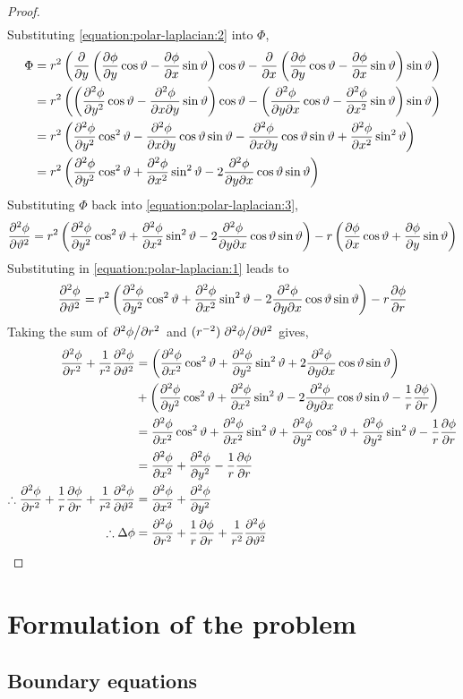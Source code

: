 \begin{lemma}
\begin{proof}
\begin{align}
        \end{align}
        Substituting \eqref{equation:polar-laplacian:2} into $\Phi$,
        \begin{align*}
            \Phi&=r^2\left(\pdv{y}\left(\pdv{\phi}{y}\cos\vartheta-\pdv{\phi}{x}\sin\vartheta\right)\cos\vartheta-\pdv{x}\left(\pdv{\phi}{y}\cos\vartheta-\pdv{\phi}{x}\sin\vartheta\right)\sin\vartheta\right)\\
            &=r^2\left(\left(\pdv[2]{\phi}{y}\cos\vartheta-\pdv{\phi}{x}{y}\sin\vartheta\right)\cos\vartheta-\left(\pdv{\phi}{y}{x}\cos\vartheta-\pdv[2]{\phi}{x}\sin\vartheta\right)\sin\vartheta\right)\\
            &=r^2\left(\pdv[2]{\phi}{y}\cos^2\vartheta-\pdv{\phi}{x}{y}\cos\vartheta\sin\vartheta-\pdv{\phi}{x}{y}\cos\vartheta\sin\vartheta+\pdv[2]{\phi}{x}\sin^2\vartheta\right)\\
            &=r^2\left(\pdv[2]{\phi}{y}\cos^2\vartheta+\pdv[2]{\phi}{x}\sin^2\vartheta-2\pdv{\phi}{y}{x}\cos\vartheta\sin\vartheta\right)
        \end{align*}
        Substituting $\Phi$ back into \eqref{equation:polar-laplacian:3},
        $$
            \pdv[2]{\phi}{\vartheta}=r^2\left(\pdv[2]{\phi}{y}\cos^2\vartheta+\pdv[2]{\phi}{x}\sin^2\vartheta-2\pdv{\phi}{y}{x}\cos\vartheta\sin\vartheta\right)-r\left(\pdv{\phi}{x}\cos\vartheta+\pdv{\phi}{y}\sin\vartheta\right)
        $$
        Substituting in \eqref{equation:polar-laplacian:1} leads to
        $$
            \pdv[2]{\phi}{\vartheta}=r^2\left(\pdv[2]{\phi}{y}\cos^2\vartheta+\pdv[2]{\phi}{x}\sin^2\vartheta-2\pdv{\phi}{y}{x}\cos\vartheta\sin\vartheta\right)-r\pdv{\phi}{r}
        $$
        Taking the sum of $\pdv*[2]{\phi}{r}$ and $(r^{-2})\pdv*[2]{\phi}{\vartheta}$ gives,
        \begin{align*}
            \pdv[2]{\phi}{r}+\frac{1}{r^2}\pdv[2]{\phi}{\vartheta}&=\left(\pdv[2]{\phi}{x}\cos^2\vartheta+\pdv[2]{\phi}{y}\sin^2\vartheta+2\pdv{\phi}{y}{x}\cos\vartheta\sin\vartheta\right)\\
            &+\left(\pdv[2]{\phi}{y}\cos^2\vartheta+\pdv[2]{\phi}{x}\sin^2\vartheta-2\pdv{\phi}{y}{x}\cos\vartheta\sin\vartheta-\frac{1}{r}\pdv{\phi}{r}\right)\\
            &=\pdv[2]{\phi}{x}\cos^2\vartheta+\pdv[2]{\phi}{x}\sin^2\vartheta+\pdv[2]{\phi}{y}\cos^2\vartheta+\pdv[2]{\phi}{y}\sin^2\vartheta-\frac{1}{r}\pdv{\phi}{r}\\
            &=\pdv[2]{\phi}{x}+\pdv[2]{\phi}{y}-\frac{1}{r}\pdv{\phi}{r}\\
            \therefore\pdv[2]{\phi}{r}+\frac{1}{r}\pdv{\phi}{r}+\frac{1}{r^2}\pdv[2]{\phi}{\vartheta}&=\pdv[2]{\phi}{x}+\pdv[2]{\phi}{y}\\
            \therefore\Delta\phi&=\pdv[2]{\phi}{r}+\frac{1}{r}\pdv{\phi}{r}+\frac{1}{r^2}\pdv[2]{\phi}{\vartheta}
        \end{align*}
    \end{proof}
\end{lemma}

\section{Formulation of the problem}
\subsection{Boundary equations}\label{section:BOUNDARY}